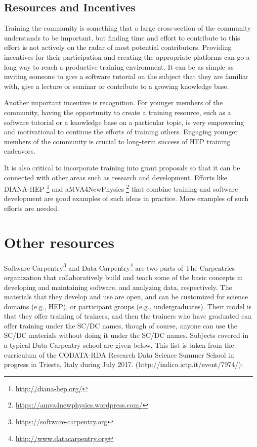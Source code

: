 \subsection{Resources and Incentives}

Training the community is something that a large cross-section of the community understands to be important, but finding time and effort to contribute to this effort is not actively on the radar of most potential contributors. Providing incentives for their participation and creating the appropriate platforms can go a long way to reach a productive training environment. It can be as simple as inviting someone to give a software tutorial on the subject that they are familiar with, give a lecture or seminar or contribute to a growing knowledge base.

Another important incentive is recognition. For younger members of the community, having the opportunity to create a training resource, such as a software tutorial or a knowledge base on a particular topic, is very empowering and motivational to continue the efforts of training others. Engaging younger members of the community is crucial to long-term success of HEP training endeavors. 

It is also critical to incorporate training into grant proposals so that it can be connected with other areas such as research and development. Efforts like DIANA-HEP \footnote{\url{http://diana-hep.org/}} and aMVA4NewPhysics \footnote{\url{https://amva4newphysics.wordpress.com/}} that combine training and software development are good examples of such ideas in practice. More examples of such efforts are needed.


\section{Other resources}

Software Carpentry\footnote{\url{https://software-carpentry.org}} and Data Carpentry\footnote{\url{http://www.datacarpentry.org}} are two parts of The Carpentries organization that collaboratively build and teach some of the basic concepts in developing and maintaining software, and analyzing data, respectively.  The materials that they develop and use are open, and can be customized for science domains
(e.g., HEP), or participant groups (e.g., undergraduates). Their model is that they offer training of trainers, and then the trainers who have graduated can offer training under the SC/DC names, though of course, anyone can use the SC/DC materials without doing it under the SC/DC names.
Subjects covered in a typical Data Carpentry school are given below. This list is taken from the curriculum of the CODATA-RDA Research Data Science Summer School in progress in Trieste, Italy during July 2017. (http://indico.ictp.it/event/7974/): 

